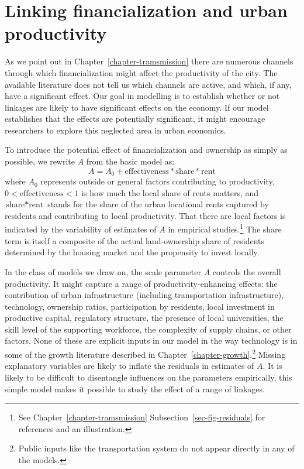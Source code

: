 \section{Linking financialization and urban productivity}
As we point out in Chapter~\ref{chapter-tramsmission} there are numerous channels through which financialization might affect the productivity of the city. The available literature does not tell us which channels are active,  and which, if any, have a significant effect. Our goal in modelling is to establish whether or not linkages are likely to have significant effects on the economy. If our model establishes that the effects are potentially significant, it might encourage researchers to explore this neglected area in urban economics.

To introduce the potential effect of financialization and ownership as simply as possible, we rewrite $A$ from the basic model as:\[ A= A_0 + \text{effectiveness} * \text{share} * \text{rent}\]
where $A_0$ represents outside or general factors contributing to productivity, $0<\text{effectiveness}<1$ is how much the local share of rents matters, and  $\text{share}*\text{rent}$ stands for the share of the urban locational rents captured by residents and contributing to local productivity. That there are local factors is indicated by the variability of estimates of $A$ in empirical studies.\footnote{See Chapter~\ref{chapter-tramsmission} Subsection~\ref{sec-fig-residuals} for references and an illustration.} 
The share term is itself a composite of the actual land-ownership share of residents determined by the housing market and the propensity to invest locally.

In the class of models we draw on, the scale parameter $A$ controls the overall productivity. It might capture a range of productivity-enhancing effects: the contribution of urban infrastructure (including transportation infrastructure), technology, ownership ratios, participation by residents, local investment in productive capital, regulatory structure, the presence of local universities, the skill level of the supporting workforce, the complexity of supply chains, or other factors. None of these are explicit inputs in our model in the way technology is in some of the growth literature described in Chapter~\ref{chapter-growth}.\footnote{Public inputs like the transportation system do not appear directly in any of the models.} 
Missing explanatory variables are likely to inflate the residuals in estimates of $A$.
It is likely to be difficult to disentangle influences on the parameters empirically, this simple model makes it possible to study the effect of a range of linkages. %

